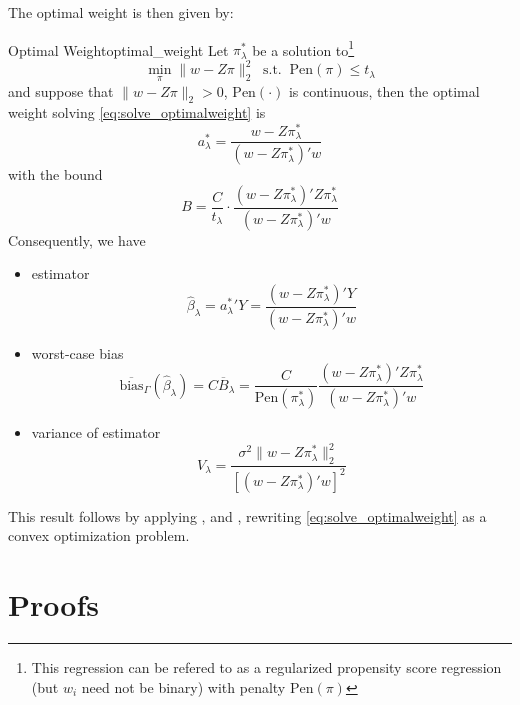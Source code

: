 \documentclass[twoside]{article}
\let\bar\overline
\theoremstyle{definition}
\begin{document}
The optimal weight is then given by:
\begin{theorem}{Optimal Weight}{optimal_weight}
  Let $\pi^*_{\lambda}$ be a solution to\footnote{This regression can be refered to as a regularized propensity score regression (but $w_i$ need not be binary) with penalty $\mathrm{Pen}(\pi)$}
  \begin{equation}\label{eq:penalizedreg}
    \min_{\pi}\lVert w-Z\pi \rVert^2_2 \ \text{ s.t. }\ \mathrm{Pen}(\pi)\leq t_{\lambda}
  \end{equation}
  and suppose that $\lVert w-Z\pi \rVert_2>0$, $\mathrm{Pen}(\cdot)$ is continuous, then the optimal weight solving \ref{eq:solve_optimalweight} is $$ a^*_{\lambda}=\frac{w-Z\pi_{\lambda}^*}{\left(w-Z\pi_{\lambda}^*\right)'w} $$
  with the bound $$ B=\frac{C}{t_{\lambda}}\cdot \frac{\left(w-Z\pi_{\lambda}^*\right)' Z\pi^*_{\lambda}}{\left(w-Z\pi_{\lambda}^*\right)'w} $$
  Consequently, we have 
  \begin{itemize}
    \item estimator $$ \hat{\beta}_{\lambda} = {a^*_{\lambda}}' Y= \frac{\left( w-Z\pi_{\lambda}^* \right)'Y}{\left(w-Z\pi_{\lambda}^*\right)'w} $$
    \item worst-case bias $$ \bar{\mathrm{bias}}_{\Gamma}\left(\hat{\beta}_{\lambda}\right) = C\bar{B}_{\lambda} = \frac{C}{\mathrm{Pen}\left(\pi^*_{\lambda}\right)}  \frac{\left( w-Z\pi_{\lambda}^* \right)'Z\pi^*_{\lambda}}{\left(w-Z\pi_{\lambda}^*\right)'w}$$
    \item variance of estimator $$ V_{\lambda} = \frac{\sigma^2 \lVert w-Z\pi_{\lambda}^* \rVert^2_2}{\left[ \left(w-Z\pi_{\lambda}^*\right)'w \right]^2} $$ 
  \end{itemize}
\end{theorem}

This result follows by applying \citet{donoho1994statistical}, \citet{low1995bias} and \citet{armstrong2018optimal}, rewriting \ref{eq:solve_optimalweight} as a convex optimization problem.

\newpage
\appendix
\section{Proofs}
\end{document}
